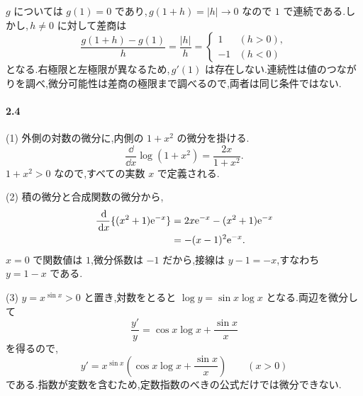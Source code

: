 $g$ については $g(1)=0$ であり,\,$g(1+h)=|h|\to0$ なので $1$ で連続である.しかし,\,$h\ne0$ に対して差商は
\[
 \frac{g(1+h)-g(1)}h=\frac{|h|}{h}
 =\begin{cases}1&(h>0),\\-1&(h<0)\end{cases}
\]
となる.右極限と左極限が異なるため,\,$g'(1)$ は存在しない.連続性は値のつながりを調べ,微分可能性は差商の極限まで調べるので,両者は同じ条件ではない.

\paragraph{2.4}
(1) 外側の対数の微分に,内側の $1+x^2$ の微分を掛ける.
\[
 \frac{\dd}{\dd x}\log(1+x^2)=\frac{2x}{1+x^2}.
\]
$1+x^2>0$ なので,すべての実数 $x$ で定義される.

(2) 積の微分と合成関数の微分から,
\begin{align*}
 \frac{\,\mathrm{d}}{\,\mathrm{d} x}\{(x^2+1)\mathrm{e}^{-x}\}
 &=2x\mathrm{e}^{-x}-(x^2+1)\mathrm{e}^{-x}\\
 &=-(x-1)^2\mathrm{e}^{-x}.
\end{align*}
$x=0$ で関数値は $1$,微分係数は $-1$ だから,接線は $y-1=-x$,すなわち $y=1-x$ である.

(3) $y=x^{\sin x}>0$ と置き,対数をとると $\log y=\sin x\log x$ となる.両辺を微分して
\[
 \frac{y'}y=\cos x\log x+\frac{\sin x}{x}
\]
を得るので,
\[
 y'=x^{\sin x}\left(\cos x\log x+\frac{\sin x}{x}\right)
 \qquad(x>0)
\]
である.指数が変数を含むため,定数指数のべきの公式だけでは微分できない.

